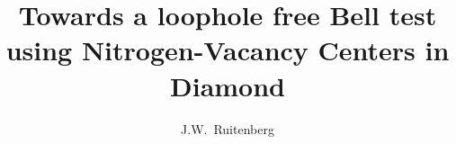 \documentclass{tudelft-report}
\begin{document}
\frontmatter

\title[On measurement basis optimization, Fusion Splicing, Data Processing and Random Numbers]{Towards a loophole free Bell test using Nitrogen-Vacancy Centers in Diamond}
\author{J.W.\ Ruitenberg}




\tableofcontents

\mainmatter








\appendix

%



\end{document}
